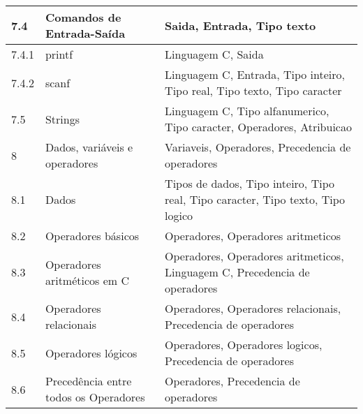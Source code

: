 \begin{longtable}{| p{} | p{} | p{} |}
7.4      & Comandos de Entrada-Saída                                & Saida, Entrada, Tipo texto                                                                                                    \\ \hline
7.4.1    & printf                                                   & Linguagem C, Saida                                                                                                            \\ \hline
7.4.2    & scanf                                                    & Linguagem C, Entrada, Tipo inteiro, Tipo real, Tipo texto, Tipo caracter                                                      \\ \hline
7.5      & Strings                                                  & Linguagem C, Tipo alfanumerico, Tipo caracter, Operadores, Atribuicao                                                         \\ \hline
8        & Dados, variáveis e operadores                            & Variaveis, Operadores, Precedencia de operadores                                                                              \\ \hline
8.1      & Dados                                                    & Tipos de dados, Tipo inteiro, Tipo real, Tipo caracter, Tipo texto, Tipo logico                                               \\ \hline
8.2      & Operadores básicos                                       & Operadores, Operadores aritmeticos                                                                                            \\ \hline
8.3      & Operadores aritméticos em C                              & Operadores, Operadores aritmeticos, Linguagem C, Precedencia de operadores                                                    \\ \hline
8.4      & Operadores relacionais                                   & Operadores, Operadores relacionais, Precedencia de operadores                                                                 \\ \hline
8.5      & Operadores lógicos                                       & Operadores, Operadores logicos, Precedencia de operadores                                                                     \\ \hline
8.6      & Precedência entre todos os Operadores                    & Operadores, Precedencia de operadores                                                                                         \\ \hline

\end{longtable}
